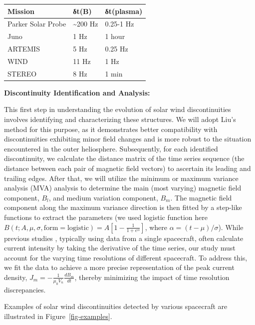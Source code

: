 \documentclass[
  letterpaper,
  DIV=11,
  numbers=noendperiod]{scrartcl}
\begin{document}
\begin{longtable}[]{@{}lll@{}}
\toprule\noalign{}
Mission & δt(B) & δt(plasma) \\
\midrule\noalign{}
\endhead
\bottomrule\noalign{}
\endlastfoot
Parker Solar Probe & \textasciitilde200 Hz & 0.25-1 Hz \\
Juno & 1 Hz & 1 hour \\
ARTEMIS & 5 Hz & 0.25 Hz \\
WIND & 11 Hz & 1 Hz \\
STEREO & 8 Hz & 1 min \\
\end{longtable}

\textbf{Discontinuity Identification and Analysis:}

This first step in understanding the evolution of solar wind discontinuities involves identifying and characterizing these structures. We will adopt Liu's method \citep{liuMagneticDiscontinuitiesSolar2022} for this purpose, as it demonstrates better compatibility with discontinuities exhibiting minor field changes and is more robust to the situation encountered in the outer heliosphere.
Subsequently, for each identified discontinuity, we calculate the distance matrix of the time series sequence (the distance between each pair of magnetic field vectors) to ascertain its leading and trailing edges.
After that, we will utilize the minimum or maximum variance analysis (MVA) analysis \citep{sonnerupMinimumMaximumVariance1998, sonnerupMagnetopauseStructureAttitude1967} to determine the main (most varying) magnetic field component, \(B_l\), and medium variation component, \(B_m\).
The magnetic field component along the maximum variance direction is then fitted by a step-like functions to extract the parameters (we used logistic function here \(B(t; A, \mu, \sigma, {\mathrm{form=logistic}}) = A \left[1 - \frac{1}{1 + e^{\alpha}} \right]\), where \(\alpha = (t - \mu)/{\sigma}\)).
While previous studies \citep{vaskoKineticscaleCurrentSheets2021, vaskoKineticscaleCurrentSheets2022}, typically using data from a single spacecraft, often calculate current intensity by taking the derivative of the time series, our study must account for the varying time resolutions of different spacecraft. To address this, we fit the data to achieve a more precise representation of the peak current density, \(J_m = - \frac{1}{\mu_0 V_n} \frac{d B_m}{d t}\), thereby minimizing the impact of time resolution discrepancies.

Examples of solar wind discontinuities detected by various spacecraft are illustrated in Figure~\ref{fig-examples}.
\end{document}
